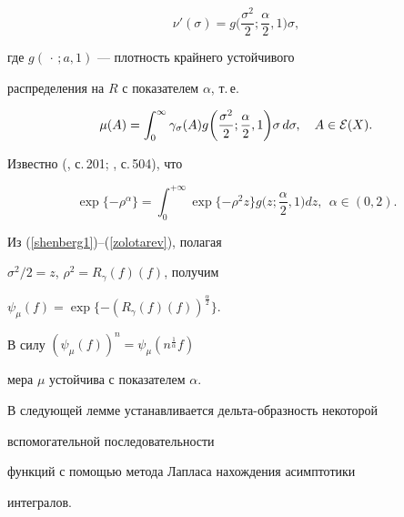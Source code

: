 \begin{equation}


\nu'(\sigma)=g\bigg(\frac{\sigma^2}2;\frac{\alpha}2,1\bigg)\sigma,


\label{krst}


\end{equation}


где $g(\,\cdot\,;a,1)$ --- плотность крайнего устойчивого \cite{Zol} 


распределения на $R$ с показателем $\alpha$, т.\,е.


$$


\mu(A)=\int_0^\infty\gamma_\sigma(A)g


\bigg(\frac{\sigma^2}2;\frac{\alpha}2,1\bigg)\sigma\,d\sigma,\quad


A\in{\cal E}(X).


$$





Известно (\cite{Zol}, с.\,201; \cite{Fel}, с.\,504), что


\begin{equation}


\exp\{-\rho^\alpha\}=\int_0^{+\infty}


\exp\{-\rho^2z\}g\bigg(z;\frac


\alpha2,1\bigg)dz,\ \ \alpha\in(0,2).


\label{zolotarev}


\end{equation}





Из (\ref{shenberg1})--(\ref{zolotarev}), полагая


$\sigma^2/2=z$, $\rho^2=R_\gamma(f)(f)$, получим


$\psi_\mu(f)=\exp\{-(R_\gamma(f)(f))^{\frac\alpha2}\}$.


В силу $(\psi_\mu(f))^n=\psi_\mu(n^{\frac1\alpha} f)$


мера $\mu$ устойчива с показателем $\alpha$.





В следующей лемме устанавливается дельта-образность некоторой 


вспомогательной последовательности


функций с помощью метода Лапласа нахождения асимптотики


интегралов.





